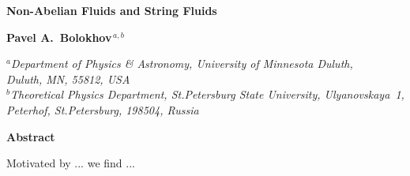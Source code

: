 \documentclass[epsfig,12pt]{article}
\begin{document}
\begin{titlepage}


\begin{center}
{  \Large \bf  Non-Abelian Fluids and String Fluids}
\end{center}

\vspace{0.4cm}

\begin{center}

{\large
\bf   Pavel A.~Bolokhov$^{\,a,b}$}
\end {center}

\begin{center}
$^a${\it Department of Physics \& Astronomy, University of Minnesota Duluth,\\
	 Duluth, MN, 55812, USA}\\
$^b${\it Theoretical Physics Department, St.Petersburg State University, Ulyanovskaya~1, 
         Peterhof, St.Petersburg, 198504, Russia}
\end{center}

\vspace{0.6cm}

\begin{center}
{\large\bf Abstract}
\end{center}

        Motivated by ... we find ...
\vspace{2cm}


\end{titlepage}




\end{document}
